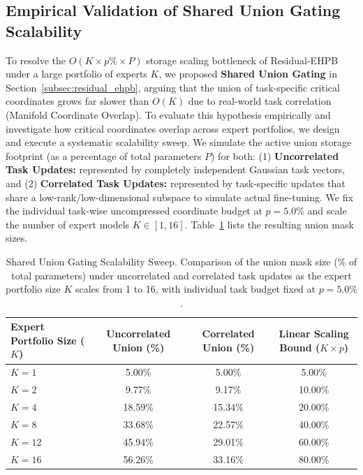 \documentclass{article}
\theoremstyle{plain}
\theoremstyle{definition}
\theoremstyle{remark}
\begin{document}
\subsection{Empirical Validation of Shared Union Gating Scalability}
\label{subsec:shared_union_gating_scaling}

To resolve the $O(K \times p\% \times P)$ storage scaling bottleneck of Residual-EHPB under a large portfolio of experts $K$, we proposed \textbf{Shared Union Gating} in Section~\ref{subsec:residual_ehpb}, arguing that the union of task-specific critical coordinates grows far slower than $O(K)$ due to real-world task correlation (Manifold Coordinate Overlap). To evaluate this hypothesis empirically and investigate how critical coordinates overlap across expert portfolios, we design and execute a systematic scalability sweep. We simulate the active union storage footprint (as a percentage of total parameters $P$) for both: (1) \textbf{Uncorrelated Task Updates:} represented by completely independent Gaussian task vectors, and (2) \textbf{Correlated Task Updates:} represented by task-specific updates that share a low-rank/low-dimensional subspace to simulate actual fine-tuning. We fix the individual task-wise uncompressed coordinate budget at $p = 5.0\%$ and scale the number of expert models $K \in [1, 16]$. Table~\ref{tab:union_gating_sweep} lists the resulting union mask sizes.

\begin{table}[h]
\caption{Shared Union Gating Scalability Sweep. Comparison of the union mask size (\% of total parameters) under uncorrelated and correlated task updates as the expert portfolio size $K$ scales from 1 to 16, with individual task budget fixed at $p = 5.0\%$.}
\label{tab:union_gating_sweep}
\vskip 0.15in
\begin{center}
\begin{small}
\begin{sc}
\begin{tabular}{lccc}
\toprule
Expert Portfolio Size ($K$) & Uncorrelated Union (\%) & Correlated Union (\%) & Linear Scaling Bound ($K \times p$) \\
\midrule
$K = 1$ & 5.00\% & 5.00\% & 5.00\% \\
$K = 2$ & 9.77\% & 9.17\% & 10.00\% \\
$K = 4$ & 18.59\% & 15.34\% & 20.00\% \\
$K = 8$ & 33.68\% & 22.57\% & 40.00\% \\
$K = 12$ & 45.94\% & 29.01\% & 60.00\% \\
$K = 16$ & 56.26\% & 33.16\% & 80.00\% \\
\bottomrule
\end{tabular}
\end{sc}
\end{small}
\end{center}
\vskip -0.1in
\end{table}
\end{document}
